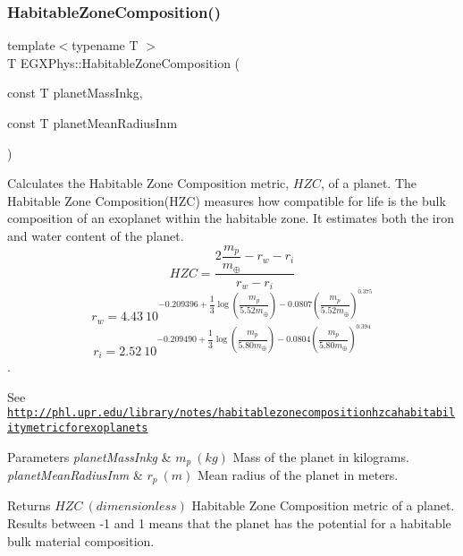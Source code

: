 \subsubsection{\texorpdfstring{Habitable\+Zone\+Composition()}{HabitableZoneComposition()}}
{\footnotesize\ttfamily template$<$typename T $>$ \\
T E\+G\+X\+Phys\+::\+Habitable\+Zone\+Composition (\begin{DoxyParamCaption}\item[{const T}]{planet\+Mass\+Inkg,  }\item[{const T}]{planet\+Mean\+Radius\+Inm }\end{DoxyParamCaption})}



Calculates the Habitable Zone Composition metric, $HZC$, of a planet. The Habitable Zone Composition(\+H\+Z\+C) measures how compatible for life is the bulk composition of an exoplanet within the habitable zone. It estimates both the iron and water content of the planet. \[ HZC= \dfrac{ 2\dfrac{m_p}{m_{\oplus}} - r_w - r_i } { r_w - r_i } \] \[ r_w= 4.43\ 10^{ -0.209396 + \dfrac{1}{3}\log \left ( \dfrac{m_p}{5.52 m_\oplus} \right ) - 0.0807 \left ( \dfrac{m_p}{5.52 m_\oplus} \right )^{0.375}} \] \[ r_i= 2.52\ 10^{ -0.209490 + \dfrac{1}{3}\log \left ( \dfrac{m_p}{5.80 m_\oplus} \right ) - 0.0804 \left ( \dfrac{m_p}{5.80 m_\oplus} \right )^{0.394}} \]. 

See \href{http://phl.upr.edu/library/notes/habitablezonecompositionhzcahabitabilitymetricforexoplanets}{\tt http\+://phl.\+upr.\+edu/library/notes/habitablezonecompositionhzcahabitabilitymetricforexoplanets}


\begin{DoxyParams}{Parameters}
{\em planet\+Mass\+Inkg} & $m_{p}\ (kg)$ Mass of the planet in kilograms. \\
\hline
{\em planet\+Mean\+Radius\+Inm} & $r_{p}\ (m)$ Mean radius of the planet in meters. \\
\hline
\end{DoxyParams}
\begin{DoxyReturn}{Returns}
$HZC\ (dimensionless)$ Habitable Zone Composition metric of a planet. Results between -\/1 and 1 means that the planet has the potential for a habitable bulk material composition. 
\end{DoxyReturn}

